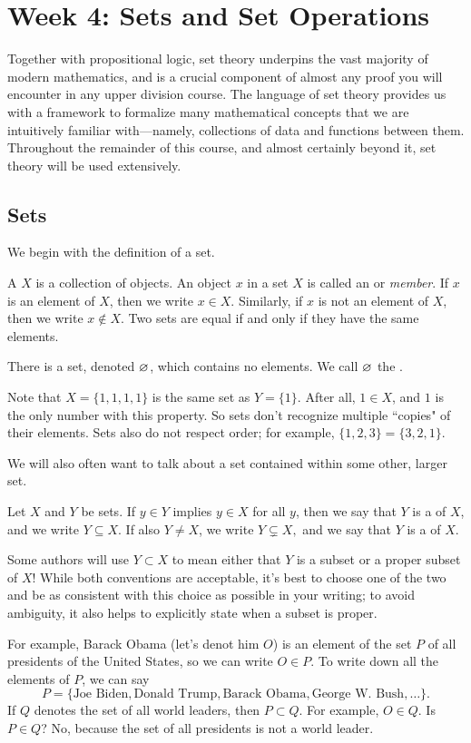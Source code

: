 \documentclass[../main.tex]{subfiles}
\begin{document}
\section{Week 4: Sets and Set Operations}
Together with propositional logic, set theory underpins the vast majority of modern mathematics, and is a crucial component of almost any proof you will encounter in any upper division course. The language of set theory provides us with a framework to formalize many mathematical concepts that we are intuitively familiar with---namely, collections of data and functions between them. Throughout the remainder of this course, and almost certainly beyond it, set theory will be used extensively.

\subsection{Sets}
We begin with the definition of a set.
\begin{definition}
    A  $X$ is a collection of objects. An object $x$ in a set $X$ is called an  or \emph{member}. If $x$ is an element of $X$, then we write $x \in X$. Similarly, if $x$ is not an element of $X$, then we write $x \notin X$. Two sets are equal if and only if they have the same elements.
\end{definition}
\begin{example}
    There is a set, denoted $\varnothing$, which contains no elements. We call $\varnothing$ the .
\end{example}
Note that $X = \{1, 1, 1, 1\}$ is the same set as $Y = \{1\}$. After all, $1 \in X$, and $1$ is the only number with this property. So sets don't recognize multiple ``copies" of their elements. Sets also do not respect order; for example, $\{1, 2, 3\} = \{3, 2, 1\}$.

We will also often want to talk about a set contained within some other, larger set.
\begin{definition}[subset]
    Let $X$ and $Y$ be sets. If $y\in Y$ implies $y\in X$ for all $y$, then we say that $Y$ is a  of $X$, and we write $Y \subseteq X.$ If also $Y \neq X$, we write $Y \subsetneq X,$ and we say that $Y$ is a  of $X$.
\end{definition}
\begin{warn}
    Some authors will use $Y \subset X$ to mean either that $Y$ is a subset or a proper subset of $X$! While both conventions are acceptable, it's best to choose one of the two and be as consistent with this choice as possible in your writing; to avoid ambiguity, it also helps to explicitly state when a subset is proper.
\end{warn}
For example, Barack Obama (let's denot him $O$) is an element of the set $P$ of all presidents of the United States, so we can write $O\in P$. To write down all the elements of $P$, we can say
\[P = \{\text{Joe Biden}, \text{Donald Trump}, \text{Barack Obama}, \text{George W. Bush}, \dots\}.\]
If $Q$ denotes the set of all world leaders, then $P \subset Q$. For example, $O \in Q$. Is $P \in Q$? No, because the set of all presidents is not a world leader.
\end{document}
